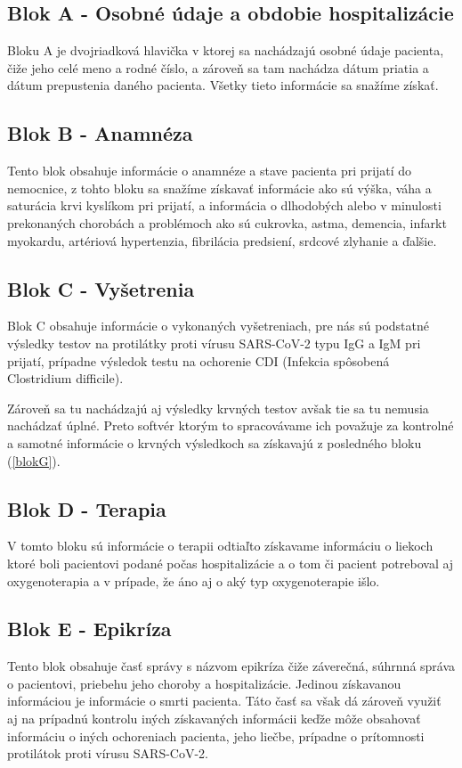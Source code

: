 \subsection{Blok A - Osobné údaje a obdobie hospitalizácie}

Bloku A je dvojriadková hlavička v ktorej sa nachádzajú osobné údaje pacienta, čiže jeho celé meno a rodné číslo, a zároveň sa tam nachádza dátum priatia a dátum prepustenia daného pacienta. Všetky tieto informácie sa snažíme získať.

\subsection{Blok B - Anamnéza}

Tento blok obsahuje informácie o anamnéze a stave pacienta pri prijatí do nemocnice, z tohto bloku sa snažíme získavať informácie ako sú výška, váha a saturácia krvi kyslíkom pri prijatí, a informácia o dlhodobých alebo v minulosti prekonaných chorobách a problémoch ako sú cukrovka, astma, demencia, infarkt myokardu, artériová hypertenzia, fibrilácia predsiení, srdcové zlyhanie a ďalšie.

\subsection{Blok C - Vyšetrenia}
\label{blokC}
Blok C obsahuje informácie o vykonaných vyšetreniach, pre nás sú podstatné výsledky testov na protilátky proti vírusu SARS-CoV-2 typu IgG a IgM pri prijatí, prípadne výsledok testu na ochorenie CDI (Infekcia spôsobená Clostridium difficile).

Zároveň sa tu nachádzajú aj výsledky krvných testov avšak tie sa tu nemusia nachádzať úplné. Preto softvér ktorým to spracovávame ich považuje za kontrolné a samotné informácie o krvných výsledkoch sa získavajú z posledného bloku (\ref{blokG}).

\subsection{Blok D - Terapia}
\label{blokD}
V tomto bloku sú informácie o terapii odtiaľto získavame informáciu o liekoch ktoré boli pacientovi podané počas hospitalizácie a o tom či pacient potreboval aj oxygenoterapia a v prípade, že áno aj o aký typ oxygenoterapie išlo.

\subsection{Blok E - Epikríza}
\label{blokE}
Tento blok obsahuje časť správy s názvom epikríza čiže záverečná, súhrnná správa o pacientovi, priebehu jeho choroby a hospitalizácie. Jedinou získavanou informáciou je informácie o smrti pacienta. Táto časť sa však dá zároveň využiť aj na prípadnú kontrolu iných získavaných informácii keďže môže obsahovať informáciu o iných ochoreniach pacienta, jeho liečbe, prípadne o prítomnosti protilátok proti vírusu SARS-CoV-2.

